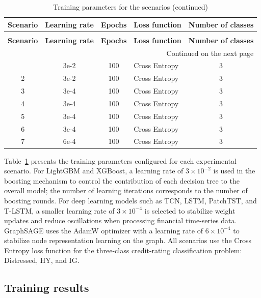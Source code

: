\documentclass[10pt,twoside]{article}
\newcommand{\fairsmallfont}{\fontsize{9pt}{11pt}\selectfont}
\begin{document}
\begingroup
\centering
\begin{longtable}{c c c l c}
\caption{Training parameters for the scenarios}
\label{tab:hyperparameter}\\
\hline
\textbf{Scenario} & \textbf{Learning rate} & \textbf{Epochs} & \textbf{Loss function} & \textbf{Number of classes} \\
\hline
\endfirsthead
\caption[]{Training parameters for the scenarios (continued)}\\
\hline
\textbf{Scenario} & \textbf{Learning rate} & \textbf{Epochs} & \textbf{Loss function} & \textbf{Number of classes} \\
\hline
\endhead
\hline
\multicolumn{5}{r}{\fairsmallfont Continued on the next page}\\
\endfoot
\hline
\endlastfoot
1 & 3e-2 & 100 & Cross Entropy & 3 \\
2 & 3e-2 & 100 & Cross Entropy & 3 \\
3 & 3e-4 & 100 & Cross Entropy & 3 \\
4 & 3e-4 & 100 & Cross Entropy & 3 \\
5 & 3e-4 & 100 & Cross Entropy & 3 \\
6 & 3e-4 & 100 & Cross Entropy & 3 \\
7 & 6e-4 & 100 & Cross Entropy & 3 \\
\end{longtable}
\endgroup

Table~\ref{tab:hyperparameter} presents the training parameters configured for each experimental scenario. For LightGBM and XGBoost, a learning rate of $3\times10^{-2}$ is used in the boosting mechanism to control the contribution of each decision tree to the overall model; the number of learning iterations corresponds to the number of boosting rounds. For deep learning models such as TCN, LSTM, PatchTST, and T-LSTM, a smaller learning rate of $3\times10^{-4}$ is selected to stabilize weight updates and reduce oscillations when processing financial time-series data. GraphSAGE uses the AdamW optimizer with a learning rate of $6\times10^{-4}$ to stabilize node representation learning on the graph. All scenarios use the Cross Entropy loss function for the three-class credit-rating classification problem: Distressed, HY, and IG.

\subsection{Training results}
\end{document}
